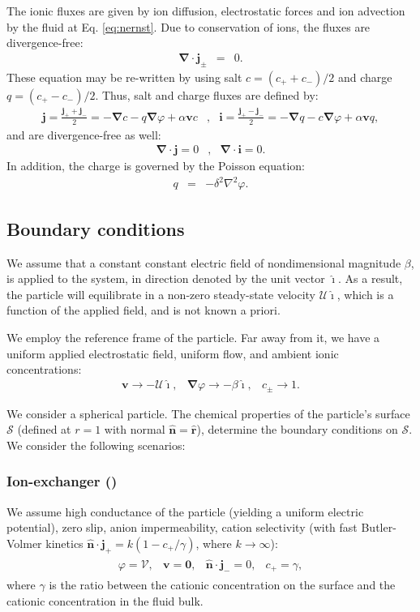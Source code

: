 \documentclass[10pt]{ijnam}
\newcommand\Laplacian{\nabla^2}
\newcommand\bnabla{\boldsymbol{\nabla}}
\newcommand\bv{\boldsymbol{v}}
\newcommand\bn{\boldsymbol{\hat{n}}}
\newcommand\bj{\boldsymbol{j}}
\newcommand\bi{\boldsymbol{i}}
\newcommand\br{\boldsymbol{r}}
\newcommand\brhat{\hat{\br}}
\newcommand\bzero{\boldsymbol{0}}
\newcommand\cU{\mathscr{U}}
\newcommand\cV{\mathscr{V}}
\newcommand\ui{\boldsymbol{\hat{\imath}}}
\begin{document}
The ionic fluxes are given by ion diffusion, electrostatic forces and ion advection by the fluid
at Eq. \ref{eq:nernst}. Due to conservation of ions, the fluxes are divergence-free:
\begin{eqnarray*}
\bnabla \cdot \bj_\pm &=& 0.
\end{eqnarray*}
These equation may be re-written by using salt $c = (c_+ + c_-)/2$ and charge $q = (c_+ - c_-)/2$.
Thus, salt and charge fluxes are defined by:
\begin{eqnarray*}
  \bj = \frac{\bj_+ + \bj_-}{2} = -\bnabla c - q \bnabla \varphi + \alpha \bv c &,& 
  \bi = \frac{\bj_+ - \bj_-}{2} = -\bnabla q - c \bnabla \varphi + \alpha \bv q,
\end{eqnarray*}
and are divergence-free as well:
\begin{eqnarray*}
\bnabla \cdot \bj = 0 &,& 
\bnabla \cdot \bi = 0. 
\end{eqnarray*}
In addition, the charge is governed by the Poisson equation:
\begin{eqnarray*}
q &=& -\delta^2 \Laplacian \varphi.
\end{eqnarray*}

\subsection{Boundary conditions}
We assume that a constant constant electric field of nondimensional magnitude $\beta$,
is applied to the system, in direction denoted by the unit vector $\ui$.
As a result, the particle will equilibrate in 
a non-zero steady-state velocity $\cU \ui$, which is
a function of the applied field, and is not known a priori.

We employ the reference frame of the particle.
Far away from it, we have a uniform applied electrostatic field, uniform flow,
and ambient ionic concentrations:
\begin{eqnarray*}
\bv \rightarrow -\cU \ui, &
\bnabla \varphi \rightarrow -\beta\ui, &
 c_\pm \rightarrow 1.
\end{eqnarray*}

We consider a spherical particle.
The chemical properties of the particle's surface $\mathcal{S}$ (defined at $r=1$ 
with normal $\bn = \brhat$), determine the boundary conditions on $\mathcal{S}$.
We consider the following scenarios:
\subsubsection{Ion-exchanger (\cite{yariv2010migration})}
We assume high conductance of the particle (yielding a uniform electric potential),
zero slip, anion impermeability, cation selectivity 
(with fast Butler-Volmer\cite{bard2000book} kinetics
$\bn \cdot \bj_+ = k (1 - c_+/\gamma)$, where $k \rightarrow \infty$):
\begin{eqnarray*}
\begin{array}{cccc}
\varphi = \cV, &
\bv = \bzero, &
\bn \cdot \bj_- = 0, &
c_+ = \gamma,
\end{array}
\end{eqnarray*}
where $\gamma$ is the ratio between the cationic concentration on the surface and the cationic
concentration in the fluid bulk.
\end{document}
